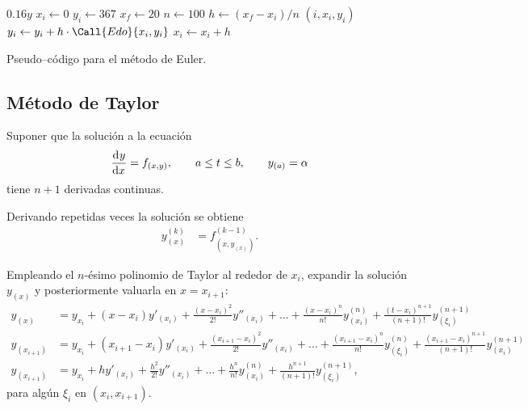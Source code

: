 \documentclass[english,spanish,Ce-table,Ce-theorem]{CabesHW}
\begin{document}
\begin{algorithm}[H]
    \centering
    \begin{myalg}[1]
        \State \Output $0.16 y$
    \EndFunction
    \State \phantom{}
    \State $x_i \gets 0$ 
    \State $y_i \gets 367$ 
    \State $x_f \gets 20$ 
    \State $n \gets 100$ 
    \State \phantom{}
    \State $h \gets (x_f - x_i)/n$ 
        \State \Output $(i, x_i, y_i)$
        \State \phantom{}
        \State $y_i \gets y_i + h\cdot\Call{Edo}{x_i, y_i}$
        \State $x_i \gets x_i + h$
    \EndFor
    \end{myalg}
    \caption{Pseudo--código para el método de Euler.}
    \label{alg:euler}
\end{algorithm}

\vspace{2em}
\subsection{Método de Taylor}
Suponer que la solución a la ecuación
\[ \td{y}{x} = f_{(x,y)}, \qquad a \leq t \leq b, \qquad y_{(a)} = \alpha \]
tiene $n+1$ derivadas continuas.

Derivando repetidas veces la solución se obtiene
\begin{align*}
\label{tay2.1}
    y^{(k)}_{(x)} &= f^{(k-1)}_{(x, y_{(x)})}. \tag{2.1}
\end{align*}

Empleando el $n$-ésimo polinomio de Taylor al rededor de $x_i$, expandir la solución $y_{(x)}$ y posteriormente valuarla en $x= x_{i+1}$:
\begin{align*}
    y_{(x)} &= y_{x_i} + (x-x_i)y'_{(x_i)} + \frac{(x-x_i)^2}{2!}y''_{(x_i)} + \ldots + \frac{(x-x_i)^{n}}{n!}y^{(n)}_{(x_i)} + \frac{(t-x_i)^{n+1}}{(n+1)!}y^{(n+1)}_{(\xi_i)}\\
    y_{(x_{i+1})} &= y_{x_i} + (x_{i+1}-x_i)y'_{(x_i)} + \frac{(x_{i+1}-x_i)^2}{2!}y''_{(x_i)} + \ldots + \frac{(x_{i+1}-x_i)^{n}}{n!}y^{(n)}_{(\xi_i)} + \frac{(x_{i+1}-x_i)^{n+1}}{(n+1)!}y^{(n+1)}_{(x_i)}\\
\label{tay2.2}
    y_{(x_{i+1})} &= y_{x_i} + hy'_{(x_i)} + \frac{h^2}{2!}y''_{(x_i)} + \ldots + \frac{h^{n}}{n!}y^{(n)}_{(x_i)} + \frac{h^{n+1}}{(n+1)!}y^{(n+1)}_{(\xi_i)}, \tag{2.2}
\end{align*}
para algún $\xi_i$ en $(x_i, x_{i+1})$.
\end{document}
